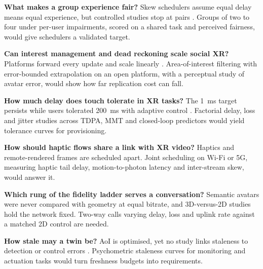 \begin{openproblems}
\item \textbf{What makes a group experience fair?} Skew schedulers assume equal delay means equal experience, but controlled studies stop at pairs \cite{W7163944086,W4392600587}. Groups of two to four under per-user impairments, scored on a shared task and perceived fairness, would give schedulers a validated target.
\item \textbf{Can interest management and dead reckoning scale social XR?} Platforms forward every update and scale linearly \cite{W4307020344}. Area-of-interest filtering with error-bounded extrapolation on an open platform, with a perceptual study of avatar error, would show how far replication cost can fall.
\item \textbf{How much delay does touch tolerate in XR tasks?} The 1~ms target persists while users tolerated 200~ms with adaptive control \cite{W4200154132}. Factorial delay, loss and jitter studies across TDPA, MMT and closed-loop predictors would yield tolerance curves for provisioning.
\item \textbf{How should haptic flows share a link with XR video?} Haptics and remote-rendered frames are scheduled apart. Joint scheduling on Wi-Fi or 5G, measuring haptic tail delay, motion-to-photon latency and inter-stream skew, would answer it.
\item \textbf{Which rung of the fidelity ladder serves a conversation?} Semantic avatars were never compared with geometry at equal bitrate, and 3D-versus-2D studies hold the network fixed. Two-way calls varying delay, loss and uplink rate against a matched 2D control are needed.
\item \textbf{How stale may a twin be?} AoI is optimised, yet no study links staleness to detection or control errors \cite{W4387870504,W7168263637}. Psychometric staleness curves for monitoring and actuation tasks would turn freshness budgets into requirements.
\end{openproblems}
